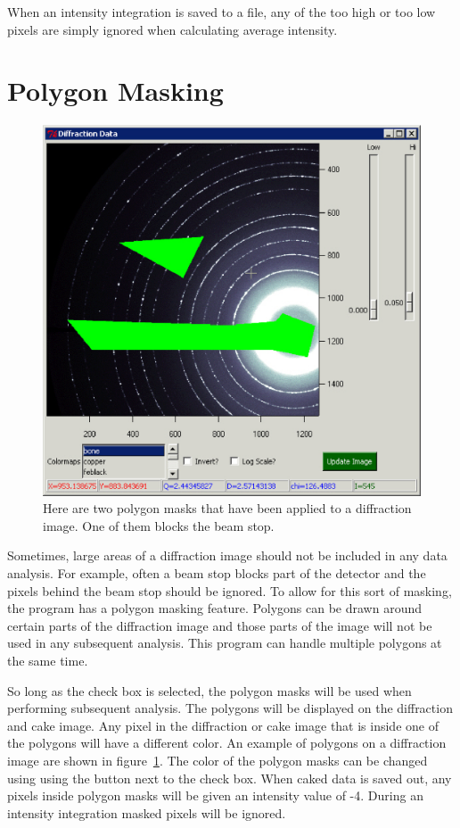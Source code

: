 When an intensity integration is saved to a file, 
any of the too high or too low pixels are simply ignored when 
calculating average intensity. 

\section{Polygon Masking}

\begin{figure}
    \centering
    \includegraphics[scale=.75]{figures/Displayed_Polygon.eps}
    \caption{Here are two polygon masks that have been applied
    to a diffraction image. One of them blocks the beam stop.}
    \label{Displayed_Polygon}
\end{figure}

Sometimes, large areas of a diffraction image should not
be included in any data analysis. For example, 
often a beam stop blocks part of the detector
and the pixels behind the beam stop should be ignored. 
To allow for this sort of masking, the program has a 
polygon masking feature. Polygons can be drawn around 
certain parts of the diffraction image and those parts 
of the image will not be used in any subsequent analysis. 
This program can handle multiple polygons at the same time.

So long as the  check box is
selected, the polygon masks will be used 
when performing subsequent analysis. 
The polygons will be displayed on the diffraction and cake image. 
Any pixel in the diffraction or cake image that is inside one of
the polygons will have a different color.
An example of polygons on a diffraction image are 
shown in figure~\ref{Displayed_Polygon}.
The color of the polygon masks can be changed using 
using the  button
next to the  check box.
When caked data is saved out, any pixels inside 
polygon masks will be given an intensity 
value of -4. During an intensity integration 
masked pixels will be ignored.

